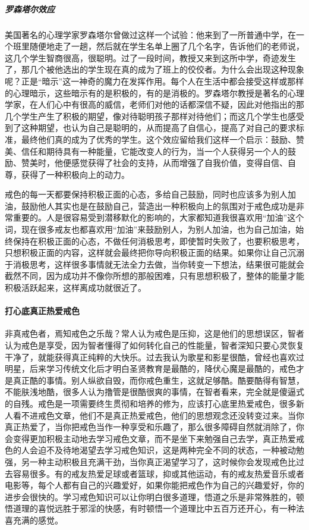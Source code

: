 \subparagraph{罗森塔尔效应}

美国著名的心理学家罗森塔尔曾做过这样一个试验：他来到了一所普通中学，在一个班里随便地走了一趟，然后就在学生名单上圈了几个名字，告诉他们的老师说，这几个学生智商很高，很聪明。过了一段时间，教授又来到这所中学，奇迹发生了，那几个被他选出的学生现在真的成为了班上的佼佼者。为什么会出现这种现象呢？正是“暗示”这一神奇的魔力在发挥作用。每个人在生活中都会接受这样或那样的心理暗示，这些暗示有的是积极的，有的是消极的。罗森塔尔教授是著名的心理学家，在人们心中有很高的威信，老师们对他的话都深信不疑，因此对他指出的那几个学生产生了积极的期望，像对待聪明孩子那样对待他们；而这几个学生也感受到了这种期望，也认为自己是聪明的，从而提高了自信心，提高了对自己的要求标准，最终他们真的成为了优秀的学生。这个效应留给我们这样一个启示：鼓励、赞美、信任和期待具有一种能量，它能改变人的行为，当一个人获得另一个人的鼓励、赞美时，他便感觉获得了社会的支持，从而增强了自我价值，变得自信、自尊，获得了一种积极向上的动力。

戒色的每一天都要保持积极正面的心态，多给自己鼓励，同时也应该多为别人加油，鼓励他人其实也是在鼓励自己，营造出一种积极向上的氛围对于戒色成功是非常重要的。人是很容易受到潜移默化的影响的，大家都知道我很喜欢用“加油”这个词，现在很多戒友也都喜欢用“加油”来鼓励别人，为别人加油，也为自己加油，始终保持在积极正面的心态，不做任何消极思考，即使暂时失败了，也要积极思考，只想积极正面的内容，这样就会最终把你导向积极正面的结果。如果你让自己沉溺于消极思考，这样很多事情就无法全力去做，当你转变一下想法，结果很可能就会截然不同，因为成功并不像你所想的那般困难，只有思想积极了，整体的能量才能积极活跃起来，这样离成功就很近了。

\paragraph{打心底真正热爱戒色}

非真戒色者，焉知戒色之乐哉？常人认为戒色是压抑，这是他们的思想误区，智者认为戒色是享受，因为智者懂得了如何转化自己的性能量，智者深知只要心灵恢复干净了，就能获得真正纯粹的大快乐。过去我认为歌星和影星很酷，曾经也喜欢过明星，后来学习传统文化后才明白圣贤教育是最酷的，降伏心魔是最酷的，戒色才是真正酷的事情。别人纵欲自毁，而你戒色重生，这就足够酷。酷要酷得有智慧，不能肤浅地酷，很多人认为撸管是很酷很爽的事情，在智者看来，完全就是傻逼式的自残。戒色是一项需要终生贯彻和培养的修为，应该打心底里热爱戒色，很多新人看不进戒色文章，他们不是真正热爱戒色，他们的思想观念还没转变过来。当你真正热爱了，当你把戒色当作一种享受和乐趣了，那么很多障碍自然就消除了，你会变得更加积极主动地去学习戒色文章，而不是坐下来勉强自己去学，真正热爱戒色的人会迫不及待地渴望去学习戒色知识，这是两种完全不同的状态，一种被动勉强，另一种主动积极且充满干劲，当你真正渴望学习了，这时候你会发现戒色比过去容易很多。有的戒友热爱足球或者篮球，抑或其他运动，有的戒友热爱音乐或者电影等，每个人都有自己的兴趣爱好，如果你能把戒色作为自己的兴趣爱好，你的进步会很快的。学习戒色知识可以让你明白很多道理，悟道之乐是非常殊胜的，顿悟道理的喜悦远胜于邪淫的快感，有时顿悟一个道理比中五百万还开心，有一种法喜充满的感觉。

